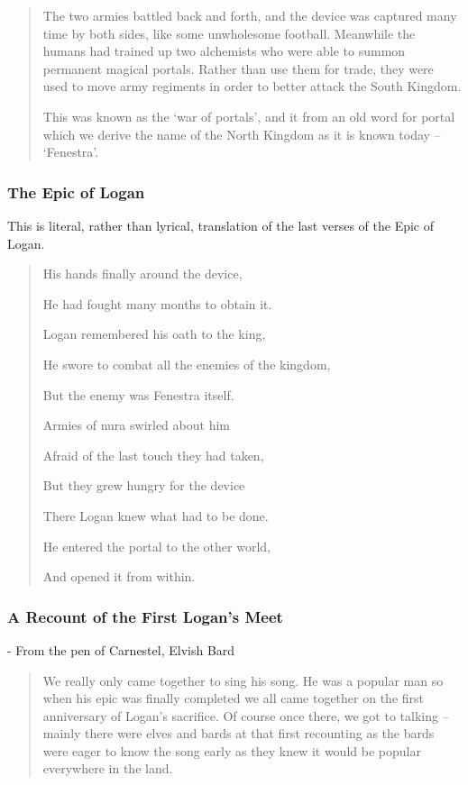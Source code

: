 \begin{multicols}{2}
\begin{quotation}
	The two armies battled back and forth, and the device was captured many time by both sides, like some unwholesome football.
	Meanwhile the humans had trained up two alchemists who were able to summon permanent magical portals.
	Rather than use them for trade, they were used to move army regiments in order to better attack the South Kingdom.

	This was known as the `war of portals', and it from an old word for portal which we derive the name of the North Kingdom as it is known today -- `Fenestra'.

\end{quotation}

\subsubsection{The Epic of Logan}

This is literal, rather than lyrical, translation of the last verses of the Epic of Logan.

\begin{verse}

	His hands finally around the device,

	He had fought many months to obtain it.

	Logan remembered his oath to the king,

	He swore to combat all the enemies of the kingdom,

	But the enemy was Fenestra itself.

	Armies of nura swirled about him

	Afraid of the last touch they had taken,

	But they grew hungry for the device

	There Logan knew what had to be done.

	He entered the portal to the other world,

	And opened it from within.

	\end{verse}

\subsubsection{A Recount of the First Logan's Meet}

- From the pen of Carnestel, Elvish Bard

\begin{quotation}

	We really only came together to sing his song.
	He was a popular man so when his epic was finally completed we all came together on the first anniversary of Logan's sacrifice.
	Of course once there, we got to talking -- mainly there were elves and bards at that first recounting as the bards were eager to know the song early as they knew it would be popular everywhere in the land.


\end{quotation}
\end{multicols}
